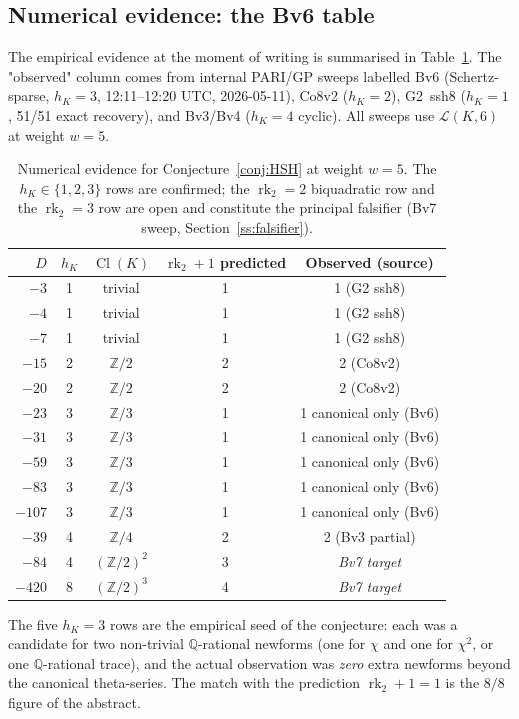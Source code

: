 \documentclass[11pt,a4paper]{amsart}
\theoremstyle{definition}
\DeclareMathOperator{\Cl}{Cl}
\DeclareMathOperator{\rk}{rk}
\newcommand{\Q}{\mathbb{Q}}
\newcommand{\Z}{\mathbb{Z}}
\newcommand{\Lcal}{\mathcal{L}}
\newcommand{\rktwo}{\rk_{2}}
\begin{document}
\subsection{Numerical evidence: the Bv6 table}\label{ss:Bv6}

The empirical evidence at the moment of writing is summarised in
Table~\ref{tab:Bv6-evidence}. The "observed" column comes from internal PARI/GP sweeps
labelled Bv6 (Schertz-sparse, $h_K = 3$, 12:11--12:20 UTC, 2026-05-11), Co8v2 ($h_K = 2$),
G2~ssh8 ($h_K = 1$, 51/51 exact recovery), and Bv3/Bv4 ($h_K = 4$ cyclic). All sweeps
use $\Lcal(K, 6)$ at weight $w = 5$.

\begin{table}[h]
\centering
\small
\begin{tabular}{rcccc}
\toprule
$D$ & $h_K$ & $\Cl(K)$ & $\rktwo+1$ predicted & Observed (source) \\
\midrule
$-3$  & 1 & trivial   & 1 & 1 (G2 ssh8)    \\
$-4$  & 1 & trivial   & 1 & 1 (G2 ssh8)    \\
$-7$  & 1 & trivial   & 1 & 1 (G2 ssh8)    \\
$-15$ & 2 & $\Z/2$    & 2 & 2 (Co8v2)      \\
$-20$ & 2 & $\Z/2$    & 2 & 2 (Co8v2)      \\
$-23$ & 3 & $\Z/3$    & 1 & 1 canonical only (Bv6) \\
$-31$ & 3 & $\Z/3$    & 1 & 1 canonical only (Bv6) \\
$-59$ & 3 & $\Z/3$    & 1 & 1 canonical only (Bv6) \\
$-83$ & 3 & $\Z/3$    & 1 & 1 canonical only (Bv6) \\
$-107$& 3 & $\Z/3$    & 1 & 1 canonical only (Bv6) \\
$-39$ & 4 & $\Z/4$    & 2 & 2 (Bv3 partial) \\
$-84$ & 4 & $(\Z/2)^2$ & 3 & \emph{Bv7 target} \\
$-420$& 8 & $(\Z/2)^3$ & 4 & \emph{Bv7 target} \\
\bottomrule
\end{tabular}
\caption{Numerical evidence for Conjecture~\ref{conj:HSH} at weight $w=5$.
The $h_K \in \{1,2,3\}$ rows are confirmed; the $\rktwo = 2$ biquadratic row and the
$\rktwo = 3$ row are open and constitute the principal falsifier (Bv7 sweep,
Section~\ref{ss:falsifier}).}
\label{tab:Bv6-evidence}
\end{table}

The five $h_K = 3$ rows are the empirical seed of the conjecture: each was a candidate
for two non-trivial $\Q$-rational newforms (one for $\chi$ and one for $\chi^2$, or one
$\Q$-rational trace), and the actual observation was \emph{zero} extra newforms beyond
the canonical theta-series. The match with the prediction $\rktwo + 1 = 1$ is the
$8/8$ figure of the abstract.
\end{document}
